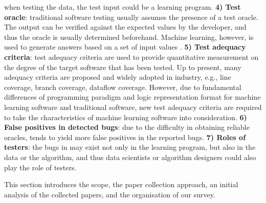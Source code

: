 when testing the data, the test input could be a learning program.
\noindent \textbf{4) Test oracle}: traditional software testing usually assumes the presence of a test oracle. 
The output can be verified against the expected values by the developer, and thus the oracle is usually determined beforehand.
Machine learning, however, is used to generate answers based on a set of input values .
\noindent \textbf{5) Test adequacy criteria}:
test adequacy criteria are used to provide quantitative measurement on the degree of the target software that has been tested. Up to present, many adequacy criteria are proposed and widely adopted in industry, e.g., line coverage, branch coverage, dataflow coverage. However, due to fundamental differences of programming paradigm and logic representation format for machine learning software and traditional software, new test adequacy criteria are required to take the characteristics of machine learning software into consideration.
\noindent \textbf{6) False positives in detected bugs}: due to the difficulty in obtaining reliable oracles, \mlt{} tends to yield more false positives in the reported bugs. 
\noindent \textbf{7) Roles of testers}: the bugs in \mlt{} may exist not only in the learning program, but also in the data or the algorithm, and thus data scientists or algorithm designers could also play the role of testers.

\label{sec:schema}
This section introduces the scope, the paper collection approach, an initial analysis of the collected papers, and the organisation of our survey.

